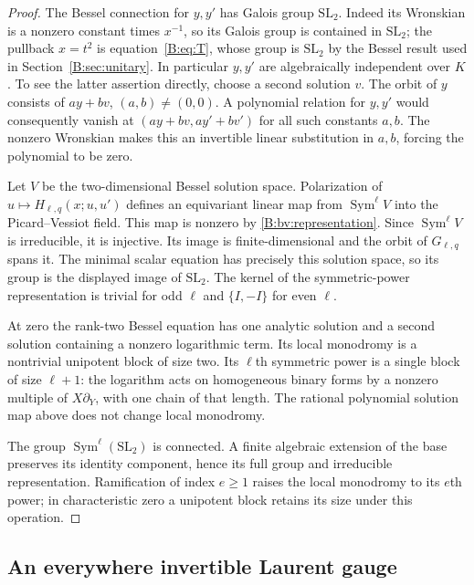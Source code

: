 \documentclass[11pt,a4paper]{article}
\theoremstyle{definition}
\theoremstyle{remark}
\numberwithin{equation}{section}
\begin{document}
\begin{proof}
The Bessel connection for $y,y'$ has Galois group $\mathrm{SL}_2$.
Indeed its Wronskian is a nonzero constant times $x^{-1}$, so its
Galois group is contained in $\mathrm{SL}_2$; the pullback $x=t^2$
is equation~\eqref{B:eq:T}, whose group is $\mathrm{SL}_2$ by the
Bessel result used in Section~\ref{B:sec:unitary}.
In particular $y,y'$ are algebraically independent over $K$.
To see the latter assertion directly, choose a second solution $v$.
The orbit of $y$ consists of $ay+bv$, $(a,b)\ne(0,0)$.
A polynomial relation for $y,y'$ would consequently vanish at
$(ay+bv,ay'+bv')$ for all such constants $a,b$. The nonzero Wronskian
makes this an invertible linear substitution in $a,b$, forcing the
polynomial to be zero.

Let $V$ be the two-dimensional Bessel solution space. Polarization
of $u\mapsto H_{\ell,q}(x;u,u')$ defines an equivariant linear map
from $\operatorname{Sym}^{\ell}V$ into the Picard--Vessiot field.
This map is nonzero by \eqref{B:bv:representation}. Since
$\operatorname{Sym}^{\ell}V$ is irreducible, it is injective. Its
image is finite-dimensional and the orbit of $G_{\ell,q}$ spans it.
The minimal scalar equation has precisely this solution space,
so its group is the displayed image of $\mathrm{SL}_2$. The kernel
of the symmetric-power representation is trivial for odd $\ell$
and $\{I,-I\}$ for even $\ell$.

At zero the rank-two Bessel equation has one analytic solution and
a second solution containing a nonzero logarithmic term. Its local
monodromy is a nontrivial unipotent block of size two. Its $\ell$th
symmetric power is a single block of size $\ell+1$: the logarithm
acts on homogeneous binary forms by a nonzero multiple of
$X\partial_Y$, with one chain of that length. The rational
polynomial solution map above does not change local monodromy.

The group $\operatorname{Sym}^{\ell}(\mathrm{SL}_2)$ is connected.
A finite algebraic extension of the base preserves its identity
component, hence its full group and irreducible representation.
Ramification of index $e\ge1$ raises the local monodromy to its
$e$th power; in characteristic zero a unipotent block retains its
size under this operation.
\end{proof}

\subsection{An everywhere invertible Laurent gauge}
\end{document}

